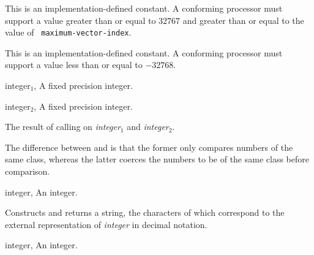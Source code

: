 \begin{optDefinition}

\remarks%
This is an implementation-defined constant.  A conforming processor
must support a value greater than or equal to $32767$ and greater than
or equal to the value of {\tt
maximum-vector-index}.


\remarks%
This is an implementation-defined constant.  A conforming processor
must support a value less than or equal to
$-32768$.

\begin{specargs}
\item[integer$_1$, \classref{fixed-precision-integer}] A fixed precision integer.
\item[integer$_2$, \classref{fixed-precision-integer}] A fixed precision integer.
\end{specargs}

\result%
The result of calling  on {\em integer$_1$} and {\em
integer$_2$}.

\remarks%
The difference between  and \functionref{=} is that the former
only compares numbers of the same class, whereas the latter coerces the numbers
to be of the same class before comparison.

%
\begin{specargs}
    \item[integer, \classref{fixed-precision-integer}] An integer.
\end{specargs}
%
\result%
Constructs and returns a string, the characters of which correspond to
the external representation of {\em integer\/} in decimal notation.

\begin{specargs}
\item[integer, \classref{fixed-precision-integer}] An integer.
\end{specargs}


\end{optDefinition}
